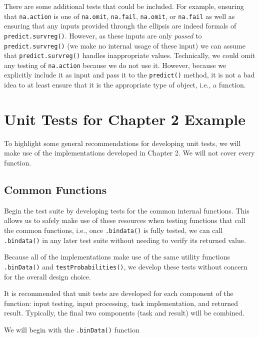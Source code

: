 \documentclass[
]{book}
\begin{document}
There are some additional tests that could be included. For example, ensuring that \texttt{na.action} is one of \texttt{na.omit}, \texttt{na.fail}, \texttt{na.omit}, or \texttt{na.fail} as well as ensuring that any inputs provided through the ellipsis are indeed formals of \texttt{predict.survreg()}. However, as these inputs are only \emph{passed} to \texttt{predict.survreg()} (we make no internal usage of these input) we can assume that \texttt{predict.survreg()} handles inappropriate values. Technically, we could omit any testing of \texttt{na.action} because we do not use it. However, because we explicitly include it as input and pass it to the \texttt{predict()} method, it is not a bad idea to at least ensure that it is the appropriate type of object, i.e., a function.

\hypertarget{unit-tests-for-chapter-2-example}{%
\section{Unit Tests for Chapter 2 Example}\label{unit-tests-for-chapter-2-example}}

To highlight some general recommendations for developing unit tests, we will make use of the implementations developed in Chapter 2. We will not cover every function.

\hypertarget{common-functions-1}{%
\subsection{Common Functions}\label{common-functions-1}}

Begin the test suite by developing tests for the common internal functions. This allows us to safely make use of these resources when testing functions that call the common functions, i.e., once \texttt{.bindata()} is fully tested, we can call \texttt{.bindata()} in any later test suite without needing to verify its returned value.

Because all of the implementations make use of the same utility functions \texttt{.binData()} and \texttt{testProbabilities()}, we develop these tests without concern for the overall design choice.

It is recommended that unit tests are developed for each component of the function: input testing, input processing, task implementation, and returned result. Typically, the final two components (task and result) will be combined.

We will begin with the \texttt{.binData()} function
\end{document}
